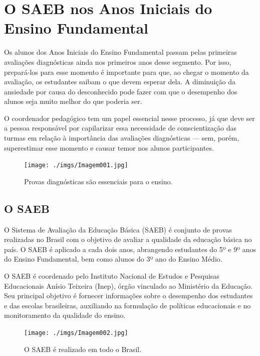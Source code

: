 \captionsetup{justification=raggedright, singlelinecheck=false}

\section{O SAEB nos Anos Iniciais do Ensino
Fundamental}

Os alunos dos Anos Iniciais do Ensino Fundamental passam pelas primeiras
avaliações diagnósticas ainda nos primeiros anos desse segmento. Por
isso, prepará-los para esse momento é importante para que, ao chegar o
momento da avaliação, os estudantes saibam o que devem esperar dela. A
diminuição da ansiedade por causa do desconhecido pode fazer com que o
desempenho dos alunos seja muito melhor do que poderia ser.

O coordenador pedagógico tem um papel essencial nesse processo, já que
deve ser a pessoa responsável por capilarizar essa necessidade de
conscientização das turmas em relação à importância das avaliações
diagnósticas --- sem, porém, superestimar esse momento e causar temor
nos alunos participantes.

\begin{figure}
\centering
\texttt{[image: ./imgs/Imagem001.jpg]}
\caption{Provas diagnósticas são essenciais para o ensino.}
\end{figure}

\subsection{O SAEB}\label{o-saeb}

O Sistema de Avaliação da Educação Básica (SAEB) é conjunto de provas
realizadas no Brasil com o objetivo de avaliar a qualidade da educação
básica no país. O SAEB é aplicado a cada dois anos, abrangendo
estudantes do 5º e 9º anos do Ensino Fundamental, bem como alunos do 3º
ano do Ensino Médio.

O SAEB é coordenado pelo Instituto Nacional de Estudos e Pesquisas
Educacionais Anísio Teixeira (Inep), órgão vinculado ao Ministério da
Educação. Seu principal objetivo é fornecer informações sobre o
desempenho dos estudantes e das escolas brasileiras, auxiliando na
formulação de políticas educacionais e no monitoramento da qualidade do
ensino.

\begin{figure}
\centering
\texttt{[image: ./imgs/Imagem002.jpg]}
\caption{O SAEB é realizado em todo o Brasil.}
\end{figure}


